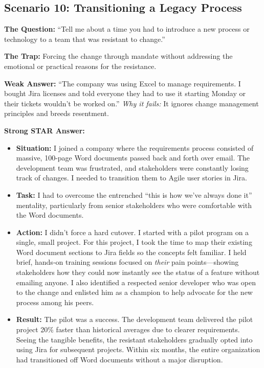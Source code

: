 \subsection{Scenario 10: Transitioning a Legacy
Process}\label{scenario-10-transitioning-a-legacy-process}

\textbf{The Question:} ``Tell me about a time you had to introduce a new
process or technology to a team that was resistant to change.''

\textbf{The Trap:} Forcing the change through mandate without addressing
the emotional or practical reasons for the resistance.

\textbf{Weak Answer:} ``The company was using Excel to manage
requirements. I bought Jira licenses and told everyone they had to use
it starting Monday or their tickets wouldn't be worked on.'' \emph{Why
it fails:} It ignores change management principles and breeds
resentment.

\textbf{Strong STAR Answer:}

\begin{itemize}
\tightlist
\item
  \textbf{Situation:} I joined a company where the requirements process
  consisted of massive, 100-page Word documents passed back and forth
  over email. The development team was frustrated, and stakeholders were
  constantly losing track of changes. I needed to transition them to
  Agile user stories in Jira.
\item
  \textbf{Task:} I had to overcome the entrenched ``this is how we've
  always done it'' mentality, particularly from senior stakeholders who
  were comfortable with the Word documents.
\item
  \textbf{Action:} I didn't force a hard cutover. I started with a pilot
  program on a single, small project. For this project, I took the time
  to map their existing Word document sections to Jira fields so the
  concepts felt familiar. I held brief, hands-on training sessions
  focused on \emph{their} pain points---showing stakeholders how they
  could now instantly see the status of a feature without emailing
  anyone. I also identified a respected senior developer who was open to
  the change and enlisted him as a champion to help advocate for the new
  process among his peers.
\item
  \textbf{Result:} The pilot was a success. The development team
  delivered the pilot project 20\% faster than historical averages due
  to clearer requirements. Seeing the tangible benefits, the resistant
  stakeholders gradually opted into using Jira for subsequent projects.
  Within six months, the entire organization had transitioned off Word
  documents without a major disruption.
\end{itemize}

